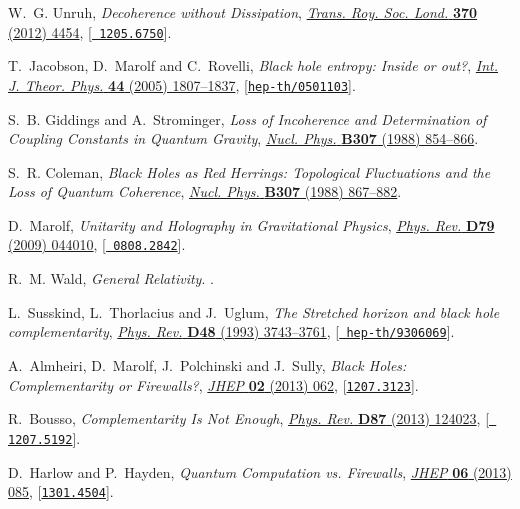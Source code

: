 \documentclass[10pt]{article}
\begin{document}
\begin{thebibliography}{100}
W.~G. Unruh, \emph{{Decoherence without Dissipation}},
  \href{http://dx.doi.org/10.1098/rsta.2012.0163}{\emph{Trans. Roy. Soc. Lond.}
  {\bf 370} (2012) 4454}, [\href{http://arxiv.org/abs/1205.6750}{{\tt
  1205.6750}}].

T.~Jacobson, D.~Marolf and C.~Rovelli, \emph{{Black hole entropy: Inside or
  out?}}, \href{http://dx.doi.org/10.1007/s10773-005-8896-z}{\emph{Int. J.
  Theor. Phys.} {\bf 44} (2005) 1807--1837},
  [\href{http://arxiv.org/abs/hep-th/0501103}{{\tt hep-th/0501103}}].

S.~B. Giddings and A.~Strominger, \emph{{Loss of Incoherence and Determination
  of Coupling Constants in Quantum Gravity}},
  \href{http://dx.doi.org/10.1016/0550-3213(88)90109-5}{\emph{Nucl. Phys.} {\bf
  B307} (1988) 854--866}.

S.~R. Coleman, \emph{{Black Holes as Red Herrings: Topological Fluctuations and
  the Loss of Quantum Coherence}},
  \href{http://dx.doi.org/10.1016/0550-3213(88)90110-1}{\emph{Nucl. Phys.} {\bf
  B307} (1988) 867--882}.

D.~Marolf, \emph{{Unitarity and Holography in Gravitational Physics}},
  \href{http://dx.doi.org/10.1103/PhysRevD.79.044010}{\emph{Phys. Rev.} {\bf
  D79} (2009) 044010}, [\href{http://arxiv.org/abs/0808.2842}{{\tt
  0808.2842}}].

R.~M. Wald, \emph{{General Relativity}}.
.

L.~Susskind, L.~Thorlacius and J.~Uglum, \emph{{The Stretched horizon and black
  hole complementarity}},
  \href{http://dx.doi.org/10.1103/PhysRevD.48.3743}{\emph{Phys. Rev.} {\bf D48}
  (1993) 3743--3761}, [\href{http://arxiv.org/abs/hep-th/9306069}{{\tt
  hep-th/9306069}}].

A.~Almheiri, D.~Marolf, J.~Polchinski and J.~Sully, \emph{{Black Holes:
  Complementarity or Firewalls?}},
  \href{http://dx.doi.org/10.1007/JHEP02(2013)062}{\emph{JHEP} {\bf 02} (2013)
  062}, [\href{http://arxiv.org/abs/1207.3123}{{\tt 1207.3123}}].

R.~Bousso, \emph{{Complementarity Is Not Enough}},
  \href{http://dx.doi.org/10.1103/PhysRevD.87.124023}{\emph{Phys. Rev.} {\bf
  D87} (2013) 124023}, [\href{http://arxiv.org/abs/1207.5192}{{\tt
  1207.5192}}].

D.~Harlow and P.~Hayden, \emph{{Quantum Computation vs. Firewalls}},
  \href{http://dx.doi.org/10.1007/JHEP06(2013)085}{\emph{JHEP} {\bf 06} (2013)
  085}, [\href{http://arxiv.org/abs/1301.4504}{{\tt 1301.4504}}].


\end{thebibliography}
\end{document}
